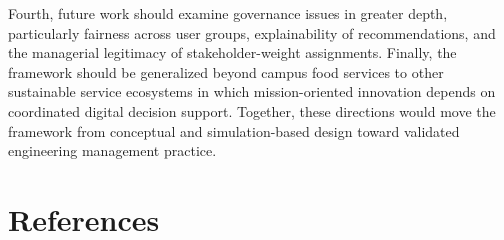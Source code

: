 \documentclass[
  letterpaper,
  DIV=11,
  numbers=noendperiod]{scrartcl}
\begin{document}
Fourth, future work should examine governance issues in greater depth,
particularly fairness across user groups, explainability of
recommendations, and the managerial legitimacy of stakeholder-weight
assignments. Finally, the framework should be generalized beyond campus
food services to other sustainable service ecosystems in which
mission-oriented innovation depends on coordinated digital decision
support. Together, these directions would move the framework from
conceptual and simulation-based design toward validated engineering
management practice.

\section*{References}\label{references}
\end{document}
